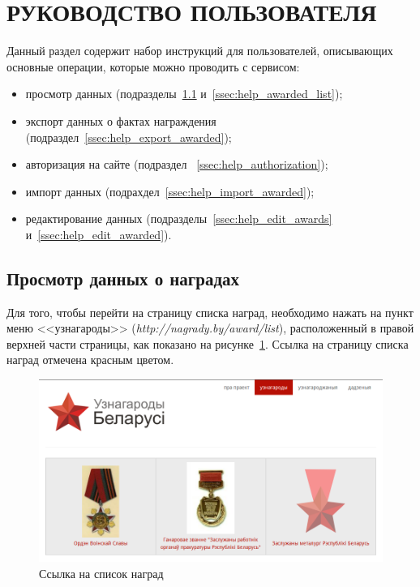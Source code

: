 \section[Руководство пользователя]{РУКОВОДСТВО ПОЛЬЗОВАТЕЛЯ}

Данный раздел содержит набор инструкций для пользователей,
описывающих основные операции, которые можно проводить с сервисом:
\begin{itemize}
\item просмотр данных
  (подразделы~\ref{ssec:help_awards_list} и~\ref{ssec:help_awarded_list});
\item экспорт данных о фактах награждения (подраздел~\ref{ssec:help_export_awarded});
\item авторизация на сайте (подраздел ~\ref{ssec:help_authorization});
\item импорт данных (подрахдел~\ref{ssec:help_import_awarded});
\item редактирование данных
  (подразделы~\ref{ssec:help_edit_awards} и~\ref{ssec:help_edit_awarded}).
\end{itemize}

\subsection{Просмотр данных о наградах}
\label{ssec:help_awards_list}

Для того, чтобы перейти на страницу списка наград,
необходимо нажать на пункт меню <<узнагароды>> (\textit{http://nagrady.by/award/list}),
расположенный в правой верхней части страницы, 
как показано на рисунке~\ref{fig:awards_link}.
Ссылка на страницу списка наград отмечена красным цветом.

\begin{figure}[h]
  \centering
  \includegraphics[width=160mm]{pic/help_awards_link.png}
  \caption{Ссылка на список наград}
  \label{fig:awards_link}
\end{figure}

